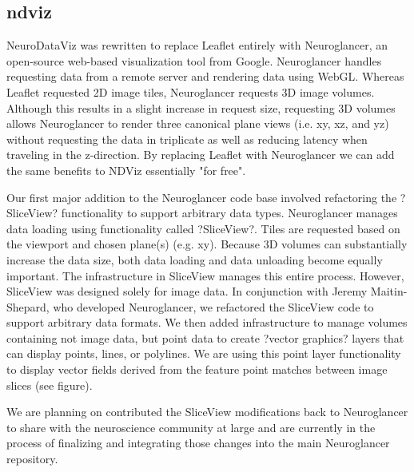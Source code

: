 \documentclass[simplex.tex]{subfiles}
\begin{document}
\subsection[ndviz]{ndviz}

NeuroDataViz was rewritten to replace Leaflet entirely with Neuroglancer, an open-source web-based visualization tool from Google. Neuroglancer handles requesting data from a remote server and rendering data using WebGL. Whereas Leaflet requested 2D image tiles, Neuroglancer requests 3D image volumes. Although this results in a slight increase in request size, requesting 3D volumes allows Neuroglancer to render three canonical plane views (i.e. xy, xz, and yz) without requesting the data in triplicate as well as reducing latency when traveling in the z-direction. By replacing Leaflet with Neuroglancer we can add the same benefits to NDViz essentially "for free". 

Our first major addition to the Neuroglancer code base involved refactoring the ?SliceView? functionality to support arbitrary data types. Neuroglancer manages data loading using functionality called ?SliceView?. Tiles are requested based on the viewport and chosen plane(s) (e.g. xy). Because 3D volumes can substantially increase the data size, both data loading and data unloading become equally important. The infrastructure in SliceView manages this entire process. However, SliceView was designed solely for image data. In conjunction with Jeremy Maitin-Shepard, who developed Neuroglancer, we refactored the SliceView code to support arbitrary data formats. We then added infrastructure to manage volumes containing not image data, but point data to create ?vector graphics? layers that can display points, lines, or polylines. We are using this point layer functionality to display vector fields derived from the feature point matches between image slices (see figure).

We are planning on contributed the SliceView modifications back to Neuroglancer to share with the neuroscience community at large and are currently in the process of finalizing and integrating those changes into the main Neuroglancer repository.
\end{document}
